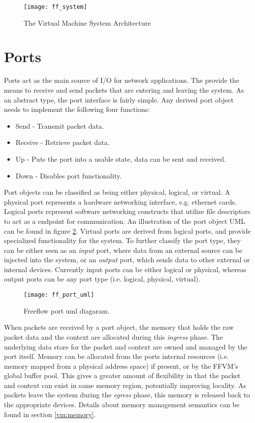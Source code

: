 \begin{figure}[h]
\centering
\texttt{[image: ff\_system]}
\caption{The Virtual Machine System Architecture}
\label{fig:ff_system}
\end{figure}

\section{Ports}
\label{vm:port}
Ports act as the main source of I/O for network applications. The provide the
means to receive and send packets that are entering and leaving the system. As
an abstract type, the port interface is fairly simple. Any derived port object
needs to implement the following four functions:

\begin{itemize}
\item Send - Transmit packet data.
\item Receive - Retrieve packet data.
\item Up - Puts the port into a usable state, data can be sent and received.
\item Down - Disables port functionality.
\end{itemize}

Port objects can be classified as being either physical, logical, or virtual. A
physical port represents a hardware networking interface, e.g. ethernet cards.
Logical ports represent software networking constructs that utilize file
descriptors to act as a endpoint for communication. An illustration of the port
object UML can be found in figure \ref{port_uml}. Virtual ports are derived
from logical ports, and provide specialized functionality for the system. To
further classify the port type, they can be either seen as an \emph{input}
port, where data from an external source can be injected into the system, or an
\emph{output} port, which sends data to other external or internal devices.
Currently input ports can be either logical or physical, whereas output ports
can be any port type (i.e. logical, physical, virtual).

\begin{figure}[h]
\centering
\texttt{[image: ff\_port\_uml]}
\caption{Freeflow port uml diagaram.}
\label{port_uml}
\end{figure}

When packets are received by a port object, the memory that holds the raw packet
data and the context are allocated during this \emph{ingress} phase. The
underlying data store for the packet and context are owned and managed by the
port itself. Memory can be allocated from the ports internal resources (i.e.
memory mapped from a physical address space) if present, or by the FFVM's global
buffer pool. This gives a greater amount of flexibility in that the packet and
context can exist in same memory region, potentially improving locality. As
packets leave the system during the \emph{egress} phase, this memory is released
back to the appropriate devices. Details about memory management semantics
can be found in section \ref{vm:memory}.

